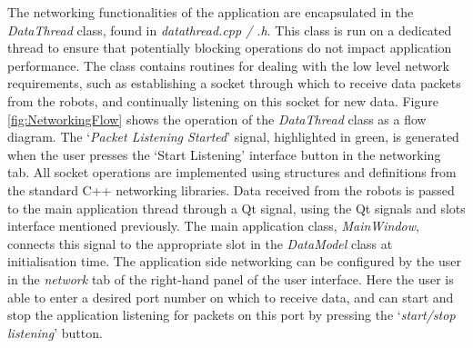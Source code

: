 The networking functionalities of the application are encapsulated in the \textit{DataThread} class, found in \textit{datathread.cpp / .h}. This class is run on a dedicated thread to ensure that potentially blocking operations do not impact application performance. The class contains routines for dealing with the low level network requirements, such as establishing a socket through which to receive data packets from the robots, and continually listening on this socket for new data. Figure \ref{fig:NetworkingFlow} shows the operation of the \textit{DataThread} class as a flow diagram. The `\textit{Packet Listening Started}' signal, highlighted in green, is generated when the user presses the `Start Listening' interface button in the networking tab. All socket operations are implemented using structures and definitions from the standard C++ networking libraries. Data received from the robots is passed to the main application thread through a Qt signal, using the Qt signals and slots interface mentioned previously. The main application class, \textit{MainWindow}, connects this signal to the appropriate slot in the \textit{DataModel} class at initialisation time. The application side networking can be configured by the user in the \textit{network} tab of the right-hand panel of the user interface. Here the user is able to enter a desired port number on which to receive data, and can start and stop the application listening for packets on this port by pressing the `\textit{start/stop listening}' button.

